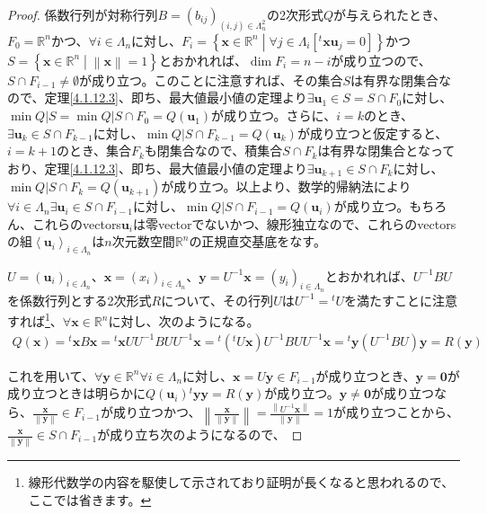 \documentclass[dvipdfmx]{jsarticle}
\begin{document}
\begin{proof}
係数行列が対称行列$B = \left( b_{ij} \right)_{(i,j) \in \varLambda_{n}^{2}}$の2次形式$Q$が与えられたとき、$F_{0} = \mathbb{R}^{n}$かつ、$\forall i \in \varLambda_{n}$に対し、$F_{i} = \left\{ \mathbf{x} \in \mathbb{R}^{n} \middle| \forall j \in \varLambda_{i}\left[{}^t \mathbf{x}\mathbf{u}_{j} = 0 \right] \right\}$かつ$S = \left\{ \mathbf{x} \in \mathbb{R}^{n} \middle| \left\| \mathbf{x} \right\| = 1 \right\}$とおかれれば、$\dim F_{i} = n - i$が成り立つので、$S \cap F_{i - 1} \neq \emptyset$が成り立つ。このことに注意すれば、その集合$S$は有界な閉集合なので、定理\ref{4.1.12.3}、即ち、最大値最小値の定理より$\exists\mathbf{u}_{1} \in S = S \cap F_{0}$に対し、$\min{Q|S} = \min{Q|S \cap F_{0}} = Q\left( \mathbf{u}_{1} \right)$が成り立つ。さらに、$i = k$のとき、$\exists\mathbf{u}_{k} \in S \cap F_{k - 1}$に対し、$\min{Q|S \cap F_{k - 1}} = Q\left( \mathbf{u}_{k} \right)$が成り立つと仮定すると、$i = k + 1$のとき、集合$F_{k}$も閉集合なので、積集合$S \cap F_{k}$は有界な閉集合となっており、定理\ref{4.1.12.3}、即ち、最大値最小値の定理より$\exists\mathbf{u}_{k + 1} \in S \cap F_{k}$に対し、$\min{Q|S \cap F_{k}} = Q\left( \mathbf{u}_{k + 1} \right)$が成り立つ。以上より、数学的帰納法により$\forall i \in \varLambda_{n}\exists\mathbf{u}_{i} \in S \cap F_{i - 1}$に対し、$\min{Q|S \cap F_{i - 1}} = Q\left( \mathbf{u}_{i} \right)$が成り立つ。もちろん、これらのvectors$\mathbf{u}_{i}$は零vectorでないかつ、線形独立なので、これらのvectorsの組$\left\langle \mathbf{u}_{i} \right\rangle_{i \in \varLambda_{n}}$は$n$次元数空間$\mathbb{R}^{n}$の正規直交基底をなす。\par
$U = \left( \mathbf{u}_{i} \right)_{i \in \varLambda_{n}}$、$\mathbf{x} = \left( x_{i} \right)_{i \in \varLambda_{n}}$、$\mathbf{y} = U^{- 1}\mathbf{x} = \left( y_{i} \right)_{i \in \varLambda_{n}}$とおかれれば、$U^{- 1}BU$を係数行列とする2次形式$R$について、その行列$U$は$U^{- 1} ={}^t U$を満たすことに注意すれば\footnote{線形代数学の内容を駆使して示されており証明が長くなると思われるので、ここでは省きます。}、$\forall\mathbf{x} \in \mathbb{R}^{n}$に対し、次のようになる。
\begin{align*}
Q\left( \mathbf{x} \right) ={}^t \mathbf{x}B\mathbf{x} ={}^t \mathbf{x}UU^{- 1}BUU^{- 1}\mathbf{x} ={}^t \left({}^t U\mathbf{x} \right)U^{- 1}BUU^{- 1}\mathbf{x} = \mathbf{}{}^t \mathbf{y}\left( U^{- 1}BU \right)\mathbf{y} = R\left( \mathbf{y} \right)
\end{align*}\par
これを用いて、$\forall\mathbf{y} \in \mathbb{R}^{n}\forall i \in \varLambda_{n}$に対し、$\mathbf{x} = U\mathbf{y} \in F_{i - 1}$が成り立つとき、$\mathbf{y} = \mathbf{0}$が成り立つときは明らかに$Q\left( \mathbf{u}_{i} \right){}^t \mathbf{yy} = R\left( \mathbf{y} \right)$が成り立つ。$\mathbf{y} \neq \mathbf{0}$が成り立つなら、$\frac{\mathbf{x}}{\left\| \mathbf{y} \right\|} \in F_{i - 1}$が成り立つかつ、$\left\| \frac{\mathbf{x}}{\left\| \mathbf{y} \right\|} \right\| = \frac{\left\| U^{- 1}\mathbf{x} \right\|}{\left\| \mathbf{y} \right\|} = 1$が成り立つことから、$\frac{\mathbf{x}}{\left\| \mathbf{y} \right\|} \in S \cap F_{i - 1}$が成り立ち次のようになるので、

\end{proof}
\end{document}
